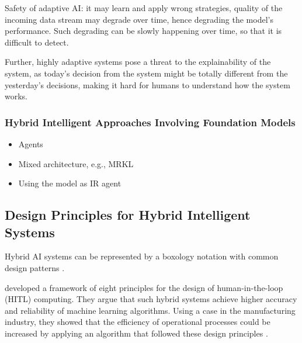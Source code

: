 Safety of adaptive AI: it may learn and apply wrong strategies, quality of the incoming data stream may degrade 
over time, hence degrading the model's performance. Such degrading can be slowly happening over time, so that it 
is difficult to detect.

Further, highly adaptive systems pose a threat to the explainability of the system, as today's decision from 
the system might be totally different from the yesterday's decisions, making it hard for humans to understand
how the system works.

\subsubsection{Hybrid Intelligent Approaches Involving Foundation Models}

\begin{itemize}
    \item Agents 
    \item Mixed architecture, e.g., MRKL \citep{@karpasMRKLSystemsModular2022}
    \item Using the model as IR agent 
\end{itemize}

\subsection{Design Principles for Hybrid Intelligent Systems}

Hybrid AI systems can be represented by a boxology notation with common design patterns \citep{harmelenBoxologyDesignPatterns2019,
vanbekkumModularDesignPatterns2021,witschelVisualizationPatternsHybrid2021}.

\cite{ostheimerAllianceHumansMachines2021} developed a framework of eight principles for the design of human-in-the-loop (HITL) 
computing. They argue that such hybrid systems achieve higher accuracy and reliability of machine learning algorithms. Using a 
case in the manufacturing industry, they showed that the efficiency of operational processes could be increased by applying an 
algorithm that followed these design principles \citep{ostheimerAllianceHumansMachines2021}.

